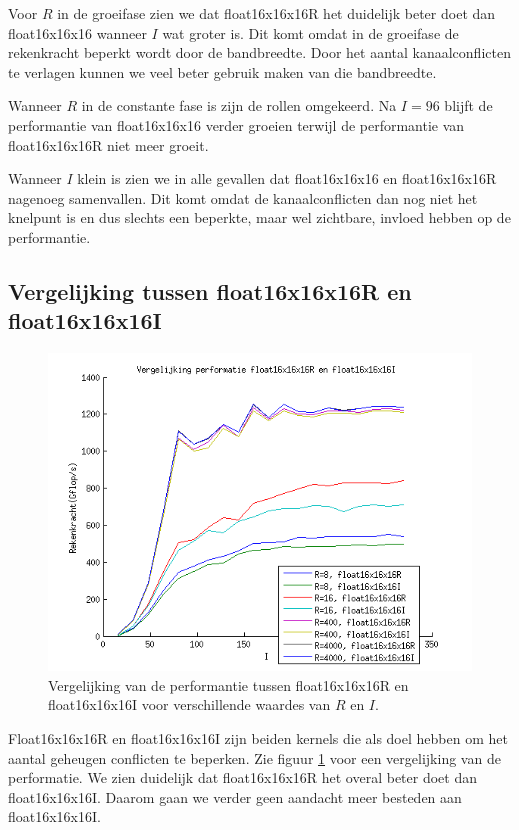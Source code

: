 Voor $R$ in de groeifase zien we dat float16x16x16R het duidelijk beter doet dan float16x16x16 wanneer $I$ wat groter is. Dit komt omdat in de groeifase de rekenkracht beperkt wordt door de bandbreedte. Door het aantal kanaalconflicten te verlagen kunnen we veel beter gebruik maken van die bandbreedte.

Wanneer $R$ in de constante fase is zijn de rollen omgekeerd. Na $I=96$ blijft de performantie van float16x16x16 verder groeien terwijl de performantie van float16x16x16R niet meer groeit.

Wanneer $I$ klein is zien we in alle gevallen dat float16x16x16 en float16x16x16R nagenoeg samenvallen. Dit komt omdat de kanaalconflicten dan nog niet het knelpunt is en dus slechts een beperkte, maar wel zichtbare, invloed hebben op de performantie.



\subsection{Vergelijking tussen float16x16x16R en float16x16x16I}
\begin{figure}[h!]
\centering
\includegraphics{fl16R_vs_fl16I}
\caption{\label{fl16R_vs_fl16I} Vergelijking van de performantie tussen float16x16x16R en float16x16x16I voor verschillende waardes van $R$ en $I$.}
\end{figure}

Float16x16x16R en float16x16x16I zijn beiden kernels die als doel hebben om het aantal geheugen conflicten te beperken. Zie figuur \ref{fl16R_vs_fl16I} voor een vergelijking van de performatie. We zien duidelijk dat float16x16x16R het overal beter doet dan float16x16x16I. Daarom gaan we verder geen aandacht meer besteden aan float16x16x16I.

